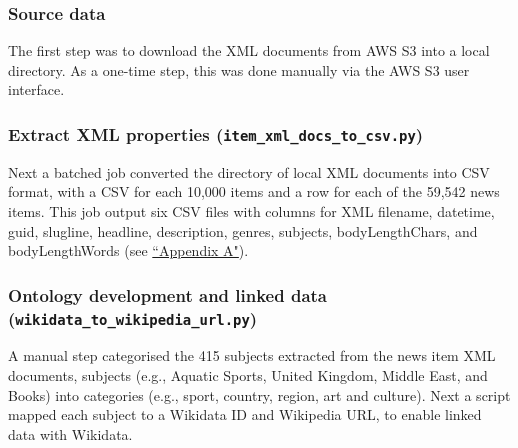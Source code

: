 \documentclass[11pt]{article}
\begin{document}
  \subsubsection{Source data}
  The first step was to download the XML documents from AWS S3 into a local directory. As a one-time step, this was done manually via the AWS S3 user interface.

  \subsubsection{Extract XML properties (\lstinline{item_xml_docs_to_csv.py})}
  Next a batched job converted the directory of local XML documents into CSV format, with a CSV for each 10,000 items and a row for each of the 59,542 news items. This job output six CSV files with columns for XML filename, datetime, guid, slugline, headline, description, genres, subjects, bodyLengthChars, and bodyLengthWords (see \hyperref[sec:AppendixA]{``Appendix A"}).
  
  \subsubsection{Ontology development and linked data (\lstinline{wikidata_to_wikipedia_url.py})}
  A manual step categorised the 415 subjects extracted from the news item XML documents, subjects (e.g., Aquatic Sports, United Kingdom, Middle East, and Books) into categories (e.g., sport, country, region, art and culture). Next a script mapped each subject to a Wikidata ID and Wikipedia URL, to enable linked data with Wikidata.
  
\end{document}
